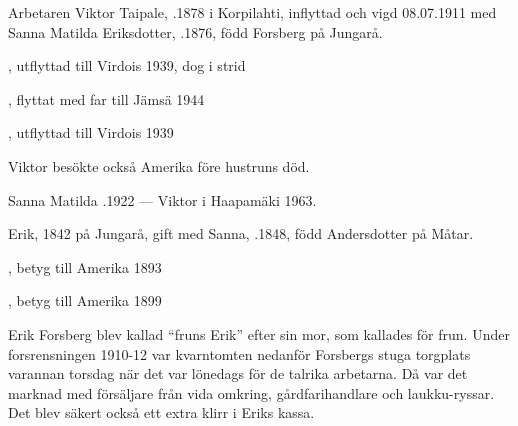 %
Arbetaren Viktor Taipale, .1878 i Korpilahti, inflyttad och vigd 08.07.1911 med Sanna Matilda Eriksdotter, .1876, född Forsberg på Jungarå.
\begin{jhchildren}
  \item {}, utflyttad till Virdois 1939, dog i strid
  \item {}
  \item {}, flyttat med far till Jämsä 1944
  \item {}
  \item {}, utflyttad till Virdois 1939
\end{jhchildren}
Viktor besökte också Amerika före hustruns död.

Sanna Matilda .1922  ---  Viktor \textdied i  Haapamäki 1963.


%
Erik,  1842 på Jungarå, gift med Sanna, .1848, född Andersdotter på Måtar.
\begin{jhchildren}
  \item {}
  \item {}, betyg till Amerika 1893
  \item {}
  \item {}
  \item {}, betyg till Amerika 1899
  \item {}
\end{jhchildren}
Erik Forsberg blev kallad ``fruns Erik'' efter sin mor, som kallades för frun. Under forsrensningen 1910-12 var kvarntomten nedanför Forsbergs stuga torgplats varannan torsdag när det var lönedags för de talrika arbetarna. Då var det marknad med försäljare från vida omkring, gårdfarihandlare och laukku-ryssar. Det blev säkert också ett extra klirr i Eriks kassa.

